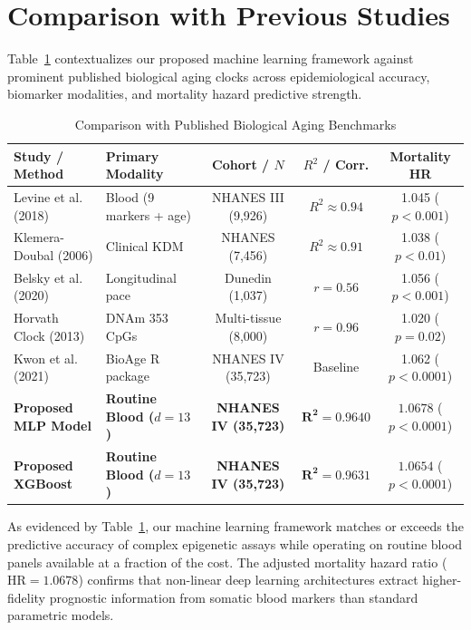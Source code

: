 \documentclass[conference]{IEEEtran}
\begin{document}
\section{Comparison with Previous Studies}
Table~\ref{tab:comparison} contextualizes our proposed machine learning framework against prominent published biological aging clocks across epidemiological accuracy, biomarker modalities, and mortality hazard predictive strength.

\begin{table}[t]
\caption{Comparison with Published Biological Aging Benchmarks}
\label{tab:comparison}
\centering
\scriptsize
\begin{tabular}{llccc}
\toprule
\textbf{Study / Method} & \textbf{Primary Modality} & \textbf{Cohort / $N$} & \textbf{$R^2$ / Corr.} & \textbf{Mortality HR} \\
\midrule
Levine et al. (2018) \cite{levine2018epigenetic} & Blood (9 markers + age) & NHANES III (9,926) & $R^2 \approx 0.94$ & 1.045 ($p < 0.001$) \\
Klemera-Doubal (2006) \cite{klemera2006new} & Clinical KDM & NHANES (7,456) & $R^2 \approx 0.91$ & 1.038 ($p < 0.01$) \\
Belsky et al. (2020) \cite{belsky2022dunedinpace} & Longitudinal pace & Dunedin (1,037) & $r = 0.56$ & 1.056 ($p < 0.001$) \\
Horvath Clock (2013) \cite{horvath2013dna} & DNAm 353 CpGs & Multi-tissue (8,000) & $r = 0.96$ & 1.020 ($p = 0.02$) \\
Kwon et al. (2021) \cite{kwon2021bioage} & BioAge R package & NHANES IV (35,723) & Baseline & 1.062 ($p < 0.0001$) \\
\midrule
\textbf{Proposed MLP Model} & \textbf{Routine Blood ($d=13$)} & \textbf{NHANES IV (35,723)} & $\mathbf{R^2 = 0.9640}$ & $\mathbf{1.0678}$ ($p < 0.0001$) \\
\textbf{Proposed XGBoost} & \textbf{Routine Blood ($d=13$)} & \textbf{NHANES IV (35,723)} & $\mathbf{R^2 = 0.9631}$ & $\mathbf{1.0654}$ ($p < 0.0001$) \\
\bottomrule
\end{tabular}
\end{table}

As evidenced by Table~\ref{tab:comparison}, our machine learning framework matches or exceeds the predictive accuracy of complex epigenetic assays while operating on routine blood panels available at a fraction of the cost. The adjusted mortality hazard ratio ($\text{HR} = 1.0678$) confirms that non-linear deep learning architectures extract higher-fidelity prognostic information from somatic blood markers than standard parametric models.
\end{document}
